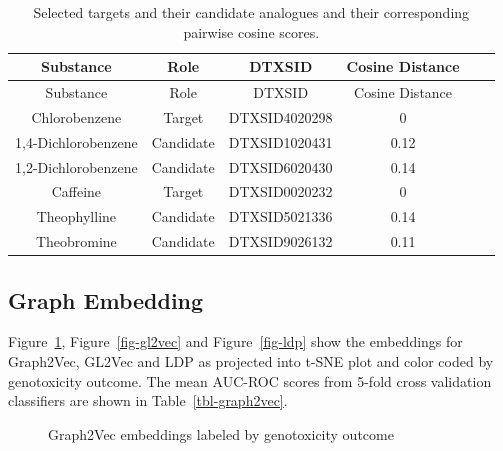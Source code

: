 \documentclass[
  super,
  preprint,
  3p]{elsarticle}
\begin{document}
\begin{longtable}[]{@{}cccccc@{}}
\caption{Selected targets and their candidate analogues and their
corresponding pairwise cosine scores.}\label{tbl-icf}\tabularnewline
\toprule\noalign{}
Substance & Role & DTXSID & Cosine Distance & & \\
\midrule\noalign{}
\endfirsthead
\toprule\noalign{}
Substance & Role & DTXSID & Cosine Distance & & \\
\midrule\noalign{}
\endhead
\bottomrule\noalign{}
\endlastfoot
Chlorobenzene & Target & DTXSID4020298 & 0 & & \\
1,4-Dichlorobenzene & Candidate & DTXSID1020431 & 0.12 & & \\
1,2-Dichlorobenzene & Candidate & DTXSID6020430 & 0.14 & & \\
Caffeine & Target & DTXSID0020232 & 0 & & \\
Theophylline & Candidate & DTXSID5021336 & 0.14 & & \\
Theobromine & Candidate & DTXSID9026132 & 0.11 & & \\
\end{longtable}

\subsection{Graph Embedding}\label{graph-embedding}

Figure~\ref{fig-graph2vec}, Figure~\ref{fig-gl2vec} and
Figure~\ref{fig-ldp} show the embeddings for Graph2Vec, GL2Vec and LDP
as projected into t-SNE plot and color coded by genotoxicity outcome.
The mean AUC-ROC scores from 5-fold cross validation classifiers are
shown in Table~\ref{tbl-graph2vec}.

\begin{figure}[H]


\caption{\label{fig-graph2vec}Graph2Vec embeddings labeled by
genotoxicity outcome}

\end{figure}%
\end{document}
